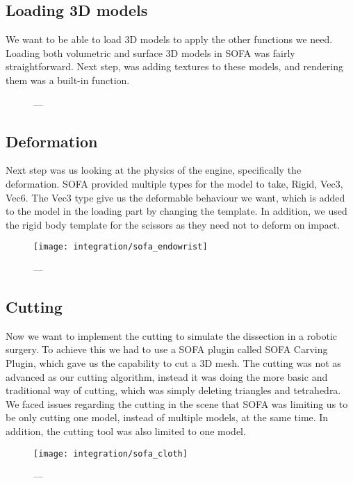 \subsection{Loading 3D models}
We want to be able to load 3D models to apply the other functions we need. Loading both volumetric and surface 3D models in SOFA was fairly straightforward. Next step, was adding textures to these models, and rendering them was a built-in function.

\begin{figure}
  \centering%
  \setlength{\fboxsep}{0pt}%
  \setlength{\fboxrule}{0.1pt}%
  \caption{---}\label{fig:sofa_textures}
\end{figure}

\subsection{Deformation}
Next step was us looking at the physics of the engine, specifically the deformation. SOFA provided multiple types for the model to take, Rigid, Vec3, Vec6. The Vec3 type give us the deformable behaviour we want, which is added to the model in the loading part by changing the template. In addition, we used the rigid body template for the scissors as they need not to deform on impact.

\begin{figure}
  \centering%
  \texttt{[image: integration/sofa\_endowrist]}
  \caption{---}\label{fig:sofa_endowrist}
\end{figure}

\subsection{Cutting}
Now we want to implement the cutting to simulate the dissection in a robotic surgery. To achieve this we had to use a SOFA plugin called SOFA Carving Plugin, which gave us the capability to cut a 3D mesh. The cutting was not as advanced as our cutting algorithm, instead it was doing the more basic and traditional way of cutting, which was simply deleting triangles and tetrahedra. We faced issues regarding the cutting in the scene that SOFA was limiting us to be only cutting one model, instead of multiple models, at the same time. In addition, the cutting tool was also limited to one model.

\begin{figure}
  \centering%
  \texttt{[image: integration/sofa\_cloth]}
  \caption{---}\label{fig:sofa_cloth}
\end{figure}

